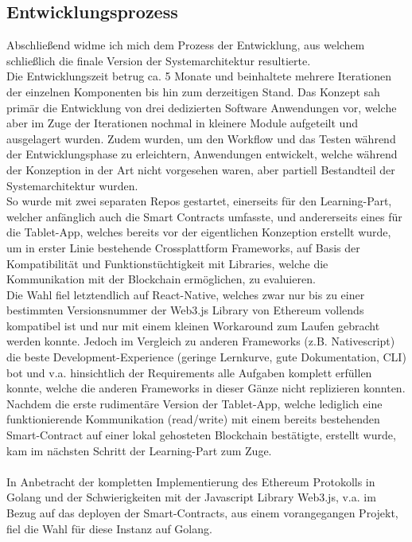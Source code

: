 \subsection{Entwicklungsprozess}
Abschließend widme ich mich dem Prozess der Entwicklung, aus welchem schließlich die finale Version der Systemarchitektur resultierte. \\
Die Entwicklungszeit betrug ca. 5 Monate und beinhaltete mehrere Iterationen der einzelnen Komponenten bis hin zum derzeitigen Stand. Das Konzept sah primär die Entwicklung von drei dedizierten Software Anwendungen vor, welche aber im Zuge der Iterationen nochmal in kleinere Module aufgeteilt und ausgelagert wurden. Zudem wurden, um den Workflow und das Testen während der Entwicklungsphase zu erleichtern, Anwendungen entwickelt, welche während der Konzeption in der Art nicht vorgesehen waren, aber partiell Bestandteil der Systemarchitektur wurden. \\
So wurde mit zwei separaten Repos gestartet, einerseits für den Learning-Part, welcher anfänglich auch die Smart Contracts umfasste, und andererseits eines für die Tablet-App, welches bereits vor der eigentlichen Konzeption erstellt wurde, um in erster Linie bestehende Crossplattform Frameworks, auf Basis der Kompatibilität und Funktionstüchtigkeit mit Libraries, welche die Kommunikation mit der Blockchain ermöglichen, zu evaluieren. \\
Die Wahl fiel letztendlich auf React-Native, welches zwar nur bis zu einer bestimmten Versionsnummer der Web3.js Library von Ethereum vollends kompatibel ist und nur mit einem kleinen Workaround zum Laufen gebracht werden konnte. 
Jedoch im Vergleich zu anderen Frameworks (z.B. Nativescript) die beste Development-Experience (geringe Lernkurve, gute Dokumentation, CLI) bot und v.a. hinsichtlich der Requirements alle Aufgaben komplett erfüllen konnte, welche die anderen Frameworks in dieser Gänze nicht replizieren konnten. \\
Nachdem die erste rudimentäre Version der Tablet-App, welche lediglich eine funktionierende Kommunikation (read/write) mit einem bereits bestehenden Smart-Contract auf einer lokal gehosteten Blockchain bestätigte, erstellt wurde, kam im nächsten Schritt der Learning-Part zum Zuge. \\\\
In Anbetracht der kompletten Implementierung des Ethereum Protokolls in Golang und der Schwierigkeiten mit der Javascript Library Web3.js, v.a. im Bezug auf das deployen der Smart-Contracts, aus einem vorangegangen Projekt, fiel die Wahl für diese Instanz auf Golang. \\
